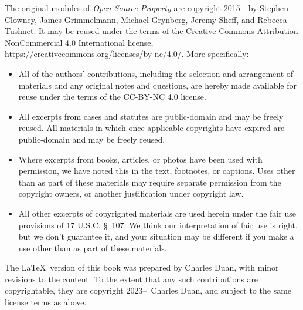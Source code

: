 The original modules of \emph{Open Source Property} are copyright
2015--\the\year\ by
Stephen Clowney, James Grimmelmann, Michael Grynberg, Jeremy Sheff, and Rebecca
Tushnet. It may be reused under the terms of the Creative Commons Attribution
NonCommercial 4.0 International license,
\url{https://creativecommons.org/licenses/by-nc/4.0/}. More specifically:
\begin{itemize}
\item   All of the authors' contributions, including the selection and
arrangement of
materials and any original notes and questions, are hereby made available for
reuse under the terms of the CC-BY-NC 4.0 license.
\item   All excerpts from cases and statutes are public-domain and may be freely
reused. All materials in which once-applicable copyrights have expired are
public-domain and may be freely reused.
\item   Where excerpts from books, articles, or photos have been used with
permission, we have noted this in the text, footnotes, or captions. Uses other
than as part of these materials may require separate permission from the
copyright owners, or another justification under copyright law.
\item   All other excerpts of copyrighted materials are used herein under the
fair use provisions of 17 U.S.C. \S~107. We think our interpretation of fair use
is right, but we don’t guarantee it, and your situation may be different if you
make a use other than as part of these materials.
\end{itemize}

The \LaTeX\ version of this book was prepared by Charles Duan, with minor
revisions to the content. To the extent that any such contributions are
copyrightable, they are copyright 2023--\the\year\ Charles Duan, and subject to
the same license terms as above.
